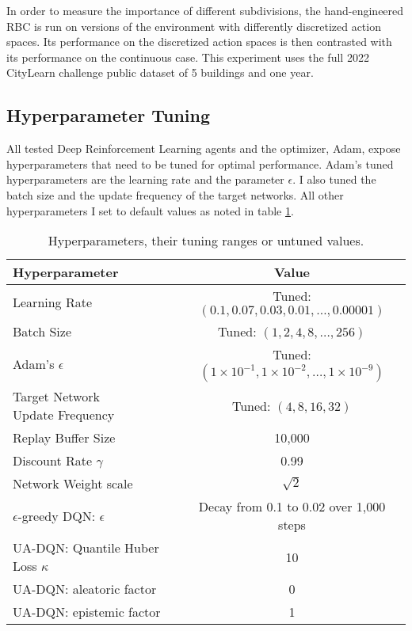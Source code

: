 In order to measure the importance of different subdivisions, the hand-engineered RBC is run on versions of the environment with differently discretized action spaces.
Its performance on the discretized action spaces is then contrasted with its performance on the continuous case.
This experiment uses the full 2022 CityLearn challenge public dataset of 5 buildings and one year.


\subsection{Hyperparameter Tuning}
All tested Deep Reinforcement Learning agents and the optimizer, Adam, expose hyperparameters that need to be tuned for optimal performance.
Adam's tuned hyperparameters are the learning rate and the parameter $\epsilon$.
I also tuned the batch size and the update frequency of the target networks.
All other hyperparameters I set to default values as noted in table \ref{tab:tuning}.

\begin{table}
    \centering
    \caption{Hyperparameters, their tuning ranges or untuned values.}
    \label{tab:tuning}
    \begin{tabular}{l|c}
        Hyperparameter & Value \\ \hline
        Learning Rate  & Tuned:  $(0.1, 0.07, 0.03, 0.01, \dots, 0.00001)$                               \\
        Batch Size     & Tuned: $(1,2,4,8,\dots ,256)$                             \\
        Adam's $\epsilon$ & Tuned: $(1\times 10^{-1}, 1\times 10^{-2}, \dots, 1\times 10^{-9})$                           \\
        \makecell[l]{Target Network \\ Update Frequency} & Tuned: $(4, 8, 16, 32)$ \\ \hline
        Replay Buffer Size & 10,000 \\
        Discount Rate $\gamma$ & 0.99 \\ %
        Network Weight scale & $\sqrt{2}$ \\
        $\epsilon$-greedy DQN: $\epsilon$ & Decay from 0.1 to 0.02 over 1,000 steps \\
        UA-DQN: Quantile Huber Loss $\kappa$ & 10 \\
        UA-DQN: aleatoric factor & 0 \\
        UA-DQN: epistemic factor & 1 \\
    \end{tabular}
\end{table}

